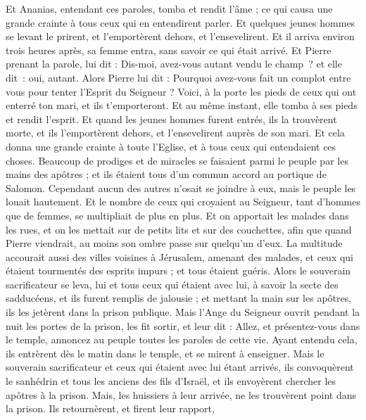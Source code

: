 \begin{multicols}{2}
Et Ananias, entendant ces paroles, tomba et rendit l'âme ; ce qui causa une grande crainte à tous ceux qui en entendirent parler.
Et quelques jeunes hommes se levant le prirent, et l'emportèrent dehors, et l’ensevelirent.
Et il arriva environ trois heures après, sa femme entra, sans savoir ce qui était arrivé.
Et Pierre prenant la parole, lui dit : Dis-moi, avez-vous autant vendu le champ ? et elle dit : oui, autant.
Alors Pierre lui dit : Pourquoi avez-vous fait un complot entre vous pour tenter l'Esprit du Seigneur ? Voici, à la porte les pieds de ceux qui ont enterré ton mari, et ils t'emporteront.
Et au même instant, elle tomba à ses pieds et rendit l'esprit. Et quand les jeunes hommes furent entrés, ils la trouvèrent morte, et ils l'emportèrent dehors, et l’ensevelirent auprès de son mari.
Et cela donna une grande crainte à toute l'Eglise, et à tous ceux qui entendaient ces choses.
Beaucoup de prodiges et de miracles se faisaient parmi le peuple par les mains des apôtres ; et ils étaient tous d'un commun accord au portique de Salomon.
Cependant aucun des autres n'osait se joindre à eux, mais le peuple les louait hautement.
Et le nombre de ceux qui croyaient au Seigneur, tant d’hommes que de femmes, se multipliait de plus en plus.
Et on apportait les malades dans les rues, et on les mettait sur de petits lits et sur des couchettes, afin que quand Pierre viendrait, au moins son ombre passe sur quelqu'un d'eux.
La multitude accourait aussi des villes voisines à Jérusalem, amenant des malades, et ceux qui étaient tourmentés des esprits impurs ; et tous étaient guéris.
Alors le souverain sacrificateur se leva, lui et tous ceux qui étaient avec lui, à savoir la secte des sadducéens, et ils furent remplis de jalousie ;
et mettant la main sur les apôtres, ils les jetèrent dans la prison publique.
Mais l’Ange du Seigneur ouvrit pendant la nuit les portes de la prison, les fit sortir, et leur dit :
Allez, et présentez-vous dans le temple, annoncez au peuple toutes les paroles de cette vie.
Ayant entendu cela, ils entrèrent dès le matin dans le temple, et se mirent à enseigner. Mais le souverain sacrificateur et ceux qui étaient avec lui étant arrivés, ils convoquèrent le sanhédrin et tous les anciens des fils d'Israël, et ils envoyèrent chercher les apôtres à la prison.
Mais, les huissiers à leur arrivée, ne les trouvèrent point dans la prison. Ils retournèrent, et firent leur rapport,

\end{multicols}
